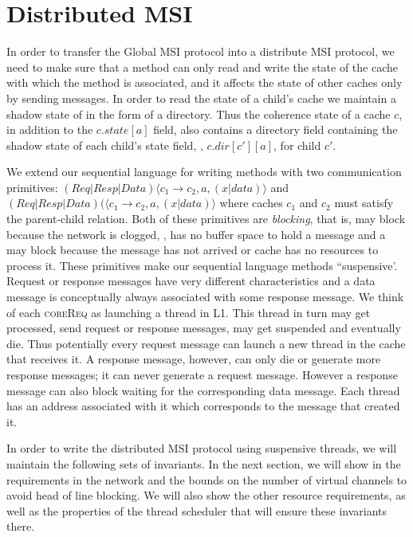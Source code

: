 \section{Distributed MSI}
\label{sec:DistributedMsi}


In order to transfer the Global MSI protocol into a distribute MSI protocol, we
need to make sure that a method can only read and write the state of the cache
with which the method is associated, and it affects the state of other caches
only by sending messages. In order to read the state of a child's cache we
maintain a shadow state of in the form of a directory. Thus the coherence state
of a cache $c$, in addition to the $c.state[a]$ field, also contains a
directory field containing the shadow state of each child's state field, \ie,
$c.dir[c'][a]$, for child $c'$.

We extend our sequential language for writing methods with two communication
primitives: \send{} $(Req|Resp|Data)\langle c_1 \rightarrow c_2, a,
(x|data)\rangle$ and \receive{} $(Req|Resp|Data)(\langle c_1 \rightarrow c_2,
a, (x|data)\rangle$ where caches $c_1$ and $c_2$ must satisfy the parent-child
relation. Both of these primitives are \emph{blocking}, that is, \send{} may
block because the network is clogged, \ie, has no buffer space to hold a
message and a \receive{} may block because the message has not arrived or cache
has no resources to process it. These primitives make our sequential language
methods ``suspensive'. Request or response messages have very different
characteristics and a data message is conceptually always associated with some
response message. We think of each \textsc{coreReq} as launching a thread in
L1. This thread in turn may get processed, send request or response messages,
may get suspended and eventually die. Thus potentially every request message
can launch a new thread in the cache that receives it. A response message,
however, can only die or generate more response messages; it can never generate
a request message. However a response message can also block waiting for the
corresponding data message. Each thread has an address associated with it which
corresponds to the message that created it.

In order to write the distributed MSI protocol using suspensive threads, we will
maintain the following sets of invariants. In the next section, we will show in
the requirements in the network and the bounds on the number of virtual channels
to avoid head of line blocking. We will also show the other resource
requirements, as well as the properties of the thread scheduler that will ensure
these invariants there.

